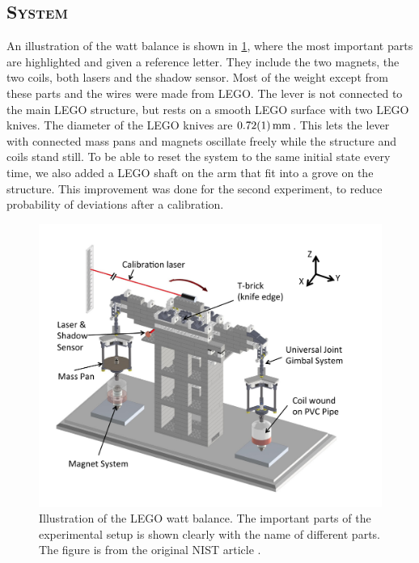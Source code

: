 \documentclass[english,a4paper,12pt,reprint]{revtex4-1}
\begin{document}
\subsection{\textsc{System}}
An illustration of the watt balance is shown in \cref{fig:watt_balance}, where the most important parts are highlighted and given a reference letter. They include the two magnets, the two coils, both lasers and the shadow sensor. Most of the weight except from these parts and the wires were made from LEGO. The lever is not connected to the main LEGO structure, but rests on a smooth LEGO surface with two LEGO knives. The diameter of the LEGO knives are $\SI{0.72\pm0.01}{\milli\meter}$. This lets the lever with connected mass pans and magnets oscillate freely while the structure and coils stand still.
To be able to reset the system to the same initial state every time, we also added a LEGO shaft on the arm that fit into a grove on the structure. This improvement was done for the second experiment, to reduce probability of deviations after a calibration.

\begin{figure}
  \centering
  \includegraphics[scale=0.37]{LEGO_watt_fig.png}
  \caption{Illustration of the LEGO watt balance. The important parts of the experimental setup is shown clearly with the name of different parts. The figure is from the original NIST article \cite{chao_lego_2015}.}
  \label{fig:watt_balance}
\end{figure}
\end{document}
